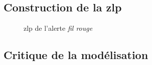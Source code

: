 \subsection{Construction de la \ac{zlp}}




\begin{figure}
  \centering
  
  \caption{\ac{zlp} de l'alerte \emph{fil rouge}}
  \label{fig:zlp_fil_rouge}
\end{figure}

\subsection{Critique de la modélisation}
\label{subsec:9-4-3}

